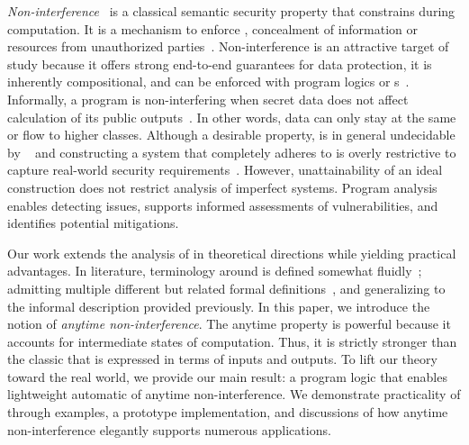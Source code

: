 \emph{Non-interference}~\cite{goguen1982} is a classical
semantic security property that constrains  during
computation. It is a mechanism to enforce \emph{}, \ie
concealment of information or resources from unauthorized
parties~\cite{bishop2003}. Non-interference is an
attractive target of study because it offers strong end-to-end guarantees for
data protection, it is inherently compositional, and can
be enforced with program logics or s~\cite{cecchetti2017,frumin2021}. Informally, a program is
non-interfering when secret data does not affect calculation of its public
outputs~\cite{sabelfeld2003}. In other words, data can only stay at the same
 or flow to higher classes. Although a desirable property,
 is in general undecidable by ~\cite{rice1953} and constructing a system that completely adheres to
 is overly restrictive to capture real-world security
requirements~\cite{bossi2005,cecchetti2017}. However, unattainability of an
ideal construction does not restrict analysis of imperfect systems. Program
analysis enables detecting  issues, supports informed
assessments of vulnerabilities, and identifies potential mitigations.

Our work extends the analysis of  in theoretical
directions while yielding practical advantages. In literature, terminology
around  is defined somewhat fluidly~\cite{sabelfeld2003};
admitting multiple different but related formal definitions~\cite{nelson2020},
and generalizing to the informal description provided previously. In this paper,
we introduce the notion of \emph{anytime
non-interference}. The anytime property is
powerful because it accounts for intermediate states of computation. Thus, it is
strictly stronger than the classic  that is expressed in
terms of inputs and outputs. To lift our theory toward the real world, we
provide our main result: a program logic \lname that enables lightweight
automatic  of anytime
non-interference. We demonstrate practicality of
\lname through examples, a prototype implementation, and discussions of
how anytime non-interference elegantly supports
numerous  applications.

